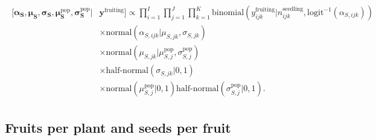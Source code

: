 \documentclass[12pt, oneside, titlepage]{article}   	%
\begin{document}
%


\begin{align}
  \begin{split}
 [  \bm{\alpha_S} , \bm{\mu_S} , \bm{\sigma_S} , \bm{\mu^\mathrm{pop}_S}, \bm{\sigma^\mathrm{pop}_S} | & \bm{y^{\mathrm{fruiting}}}  ] \propto \prod_{i=1}^{I}   \prod_{j=1}^{J}  \prod_{k=1}^{K} 
   \mathrm{binomial} ( y^{\mathrm{fruiting}}_{ijk} | n^\mathrm{seedling}_{ijk}, \mathrm{logit}^{-1}( \alpha_{S,ijk} ) ) 
   \\ & \times \mathrm{normal} ( \alpha_{S,ijk}  | \mu_{S,jk}, \sigma{_{S,jk} })
  \\ & \times \mathrm{normal} ( \mu_{S,jk}  | \mu^\mathrm{pop}_{S,j}, \sigma^\mathrm{pop}_{S,j} )
  \\ & \times \textrm{half-normal} ( \sigma_{S,jk} | 0,1)
  \\ & \times \mathrm{normal} ( \mu^\mathrm{pop}_{S,j} | 0 , 1 ) \textrm{half-normal} ( \sigma^\mathrm{pop}_{S,j} | 0,1).
  \end{split}
\end{align}


\clearpage
\newpage

\subsection*{Fruits per plant and seeds per fruit}
\end{document}
